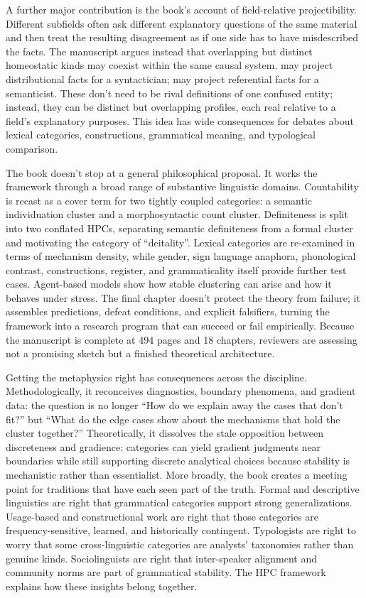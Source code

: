 \documentclass[11pt]{book}
\begin{document}
A further major contribution is the book's account of field-relative projectibility. Different subfields often ask different explanatory questions of the same material and then treat the resulting disagreement as if one side has to have misdescribed the facts. The manuscript argues instead that overlapping but distinct homeostatic kinds may coexist within the same causal system.  may project distributional facts for a syntactician;  may project referential facts for a semanticist. These don't need to be rival definitions of one confused entity; instead, they can be distinct but overlapping profiles, each real relative to a field's explanatory purposes. This idea has wide consequences for debates about lexical categories, constructions, grammatical meaning, and typological comparison.

The book doesn't stop at a general philosophical proposal. It works the framework through a broad range of substantive linguistic domains. Countability is recast as a cover term for two tightly coupled categories: a semantic individuation cluster and a morphosyntactic count cluster. Definiteness is split into two conflated HPCs, separating semantic definiteness from a formal cluster and motivating the category of \enquote{deitality}. Lexical categories are re-examined in terms of mechanism density, while gender, sign language anaphora, phonological contrast, constructions, register, and grammaticality itself provide further test cases. Agent-based models show how stable clustering can arise and how it behaves under stress. The final chapter doesn't protect the theory from failure; it assembles predictions, defeat conditions, and explicit falsifiers, turning the framework into a research program that can succeed or fail empirically. Because the manuscript is complete at 494 pages and 18 chapters, reviewers are assessing not a promising sketch but a finished theoretical architecture.

Getting the metaphysics right has consequences across the discipline. Methodologically, it reconceives diagnostics, boundary phenomena, and gradient data: the question is no longer \enquote{How do we explain away the cases that don't fit?} but \enquote{What do the edge cases show about the mechanisms that hold the cluster together?} Theoretically, it dissolves the stale opposition between discreteness and gradience: categories can yield gradient judgments near boundaries while still supporting discrete analytical choices because stability is mechanistic rather than essentialist. More broadly, the book creates a meeting point for traditions that have each seen part of the truth. Formal and descriptive linguistics are right that grammatical categories support strong generalizations. Usage-based and constructional work are right that those categories are frequency-sensitive, learned, and historically contingent. Typologists are right to worry that some cross-linguistic categories are analysts' taxonomies rather than genuine kinds. Sociolinguists are right that inter-speaker alignment and community norms are part of grammatical stability. The HPC framework explains how these insights belong together.
\end{document}
